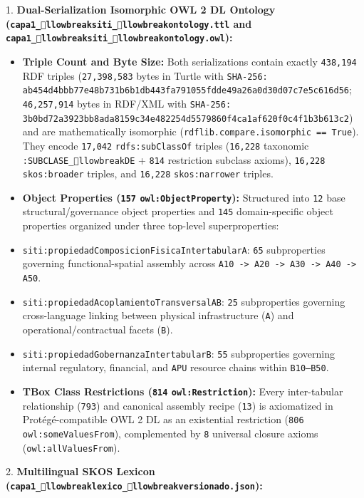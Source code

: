 \documentclass[10pt,a4paper]{article}
\begin{document}
1. \textbf{Dual-Serialization Isomorphic OWL 2 DL Ontology (\texttt{capa1\_llowbreak{}siti\_llowbreak{}ontology.ttl} and \texttt{capa1\_llowbreak{}siti\_llowbreak{}ontology.owl}):}\par
\begin{itemize}
  \item \textbf{Triple Count and Byte Size:} Both serializations contain exactly \texttt{438,194} RDF triples (\texttt{27,398,583} bytes in Turtle with \texttt{SHA-256: ab454d4bbb77e48b731b6b1db443fa791055fdde49a26a0d30d07c7e5c616d56}; \texttt{46,257,914} bytes in RDF/XML with \texttt{SHA-256: 3b0bd72a3923bb8ada8159c34e482254d5579860f4ca1af620f0c4f1b3b613c2}) and are mathematically isomorphic (\texttt{rdflib.compare.isomorphic == True}). They encode \texttt{17,042} \texttt{rdfs:subClassOf} triples (\texttt{16,228} taxonomic \texttt{:SUBCLASE\_llowbreak{}DE} + \texttt{814} restriction subclass axioms), \texttt{16,228} \texttt{skos:broader} triples, and \texttt{16,228} \texttt{skos:narrower} triples.
  \item \textbf{Object Properties (\texttt{157} \texttt{owl:ObjectProperty}):} Structured into \texttt{12} base structural/governance object properties and \texttt{145} domain-specific object properties organized under three top-level superproperties:
  \item \texttt{siti:propiedadComposicionFisicaIntertabularA}: \texttt{65} subproperties governing functional-spatial assembly across \texttt{A10 -> A20 -> A30 -> A40 -> A50}.
  \item \texttt{siti:propiedadAcoplamientoTransversalAB}: \texttt{25} subproperties governing cross-language linking between physical infrastructure (\texttt{A}) and operational/contractual facets (\texttt{B}).
  \item \texttt{siti:propiedadGobernanzaIntertabularB}: \texttt{55} subproperties governing internal regulatory, financial, and \texttt{APU} resource chains within \texttt{B10--B50}.
  \item \textbf{TBox Class Restrictions (\texttt{814} \texttt{owl:Restriction}):} Every inter-tabular relationship (\texttt{793}) and canonical assembly recipe (\texttt{13}) is axiomatized in Protégé-compatible OWL 2 DL as an existential restriction (\texttt{806} \texttt{owl:someValuesFrom}), complemented by \texttt{8} universal closure axioms (\texttt{owl:allValuesFrom}).
\end{itemize}
2. \textbf{Multilingual SKOS Lexicon (\texttt{capa1\_llowbreak{}lexico\_llowbreak{}versionado.json}):}\par
\end{document}
